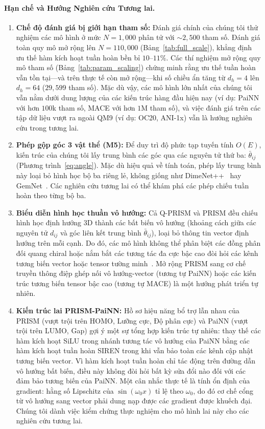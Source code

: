 \documentclass[10pt,twocolumn,letterpaper]{article}
\begin{document}
\paragraph{Hạn chế và Hướng Nghiên cứu Tương lai.}
\begin{enumerate}
    \item \textbf{Chế độ đánh giá bị giới hạn tham số:} Đánh giá chính của chúng tôi thử nghiệm các mô hình ở mức $N = 1{,}000$ phân tử với $\sim 2{,}500$ tham số. Đánh giá toàn quy mô mở rộng lên $N = 110{,}000$ (Bảng~\ref{tab:full_scale}), khẳng định ưu thế hàm kích hoạt tuần hoàn bền bỉ $10$--$11\%$. Các thí nghiệm mở rộng quy mô tham số (Bảng~\ref{tab:param_scaling}) chứng minh rằng ưu thế tuần hoàn vẫn tồn tại---và trên thực tế còn mở rộng---khi số chiều ẩn tăng từ $d_h = 4$ lên $d_h = 64$ ($29{,}599$ tham số). Mặc dù vậy, các mô hình lớn nhất của chúng tôi vẫn nằm dưới dung lượng của các kiến trúc hàng đầu hiện nay (ví dụ: PaiNN với hơn $100$k tham số, MACE với hơn $1$M tham số), và việc đánh giá trên các tập dữ liệu vượt ra ngoài QM9 (ví dụ: OC20, ANI-1x) vẫn là hướng nghiên cứu trong tương lai.
    \item \textbf{Phép gộp góc 3 vật thể (M5):} Để duy trì độ phức tạp tuyến tính $O(E)$, kiến trúc của chúng tôi lấy trung bình các góc qua các nguyên tử thứ ba: $\bar{\theta}_{ij}$ (Phương trình~\ref{eq:angle}). Mặc dù hiệu quả về tính toán, phép lấy trung bình này loại bỏ hình học bộ ba riêng lẻ, không giống như DimeNet++~\cite{klicperaFastUncertaintyAwareDirectional2020} hay GemNet~\cite{klicperaGemNetUniversalDirectional2021}. Các nghiên cứu tương lai có thể khám phá các phép chiếu tuần hoàn theo từng bộ ba.
    \item \textbf{Biểu diễn hình học thuần vô hướng:} Cả Q-PRISM và PRISM đều chiếu hình học định hướng 3D thành các bất biến vô hướng (khoảng cách giữa các nguyên tử $d_{ij}$ và góc liên kết trung bình $\bar{\theta}_{ij}$), loại bỏ thông tin vector định hướng trên mỗi cạnh. Do đó, các mô hình không thể phân biệt các đồng phân đối quang chiral hoặc nắm bắt các tương tác đa cực bậc cao đòi hỏi các kênh tương biến vector hoặc tensor tường minh~\cite{schuttEquivariantMessagePassing2021, batatiaMACEHigherOrder2022}. Mở rộng PRISM sang cơ chế truyền thông điệp ghép nối vô hướng-vector (tương tự PaiNN) hoặc các kiến trúc tương biến tensor bậc cao (tương tự MACE) là một hướng phát triển tự nhiên.
    \item \textbf{Kiến trúc lai PRISM-PaiNN:} Hồ sơ hiệu năng bổ trợ lẫn nhau của PRISM (vượt trội trên HOMO, Lưỡng cực, Độ phân cực) và PaiNN (vượt trội trên LUMO, Gap) gợi ý một sự tổng hợp kiến trúc tự nhiên: thay thế các hàm kích hoạt SiLU trong nhánh tương tác vô hướng của PaiNN bằng các hàm kích hoạt tuần hoàn SIREN trong khi vẫn bảo toàn các kênh cập nhật tương biến vector. Vì hàm kích hoạt tuần hoàn chỉ tác động trên đường dẫn vô hướng bất biến, điều này không đòi hỏi bất kỳ sửa đổi nào đối với các đảm bảo tương biến của PaiNN. Một cân nhắc thực tế là tính ổn định của gradient: hằng số Lipschitz của $\sin(\omega_0 x)$ tỉ lệ theo $\omega_0$, do đó cơ chế cổng từ vô hướng sang vector phải dung nạp được các gradient được khuếch đại. Chúng tôi dành việc kiểm chứng thực nghiệm cho mô hình lai này cho các nghiên cứu tương lai.

\end{enumerate}
\end{document}
